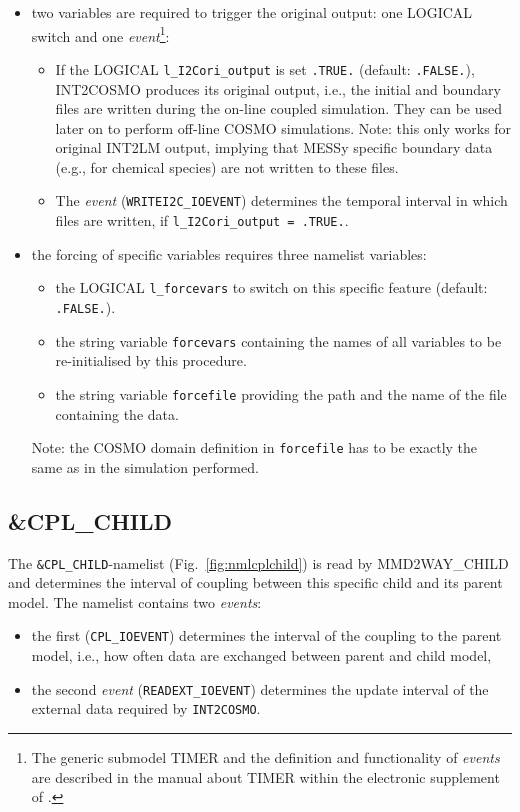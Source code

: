 \documentclass[11pt,twoside]{article}
\begin{document}
\begin{itemize}
\item two variables are required to trigger the original output: one
{\footnotesize LOGICAL }switch and one {\it event}\footnote{The generic submodel TIMER and the definition and  
functionality of {\it events} are described in the manual about TIMER within the
 electronic supplement of \cite{Joeckel10a}.}:
\begin{itemize}
\item If the {\footnotesize LOGICAL} \verb|l_I2Cori_output| is
set \verb|.TRUE.| (default: \verb|.FALSE.|), INT2COSMO produces its original output, i.e., the
initial and boundary files are written during the on-line coupled
simulation. They can be used later on to perform off-line COSMO
simulations.
Note: this only works for original INT2LM output, implying that MESSy
specific boundary data (e.g., for chemical species) are not written to these files.

\item The {\it event} (\verb|WRITEI2C_IOEVENT|) determines the
temporal interval in which files are written, if 
\verb|l_I2Cori_output = .TRUE.|.
\end{itemize}

\item the forcing of specific variables requires three namelist variables:
\begin{itemize}
\item the {\footnotesize LOGICAL} \verb|l_forcevars| to switch on
this specific feature (default: \verb|.FALSE.|).
\item the string variable \verb|forcevars| containing the names of all
variables to be re-initialised by this procedure.
\item the string variable \verb|forcefile| providing the path and the name
of the file containing the data.
\end{itemize}
Note: the COSMO domain definition in \verb|forcefile| has to
be exactly the same as in the simulation performed.
\end{itemize}

\subsection{\protect\&CPL\_CHILD}\label{sec:nmlcplchild}
The \verb|&CPL_CHILD|-namelist (Fig.\ \ref{fig:nmlcplchild}) is read by
MMD2WAY\_CHILD and determines the interval of coupling between this specific
child and its parent model. The namelist contains two 
{\it events}:
\begin{itemize}
\item the first (\verb|CPL_IOEVENT|) determines the interval of the
coupling to the parent model, i.e., how often data are exchanged
between parent and child model, 
\item the second {\it event} (\verb|READEXT_IOEVENT|) determines the
update interval of the
 external data required by \verb|INT2COSMO|.
\end{itemize}
\end{document}
